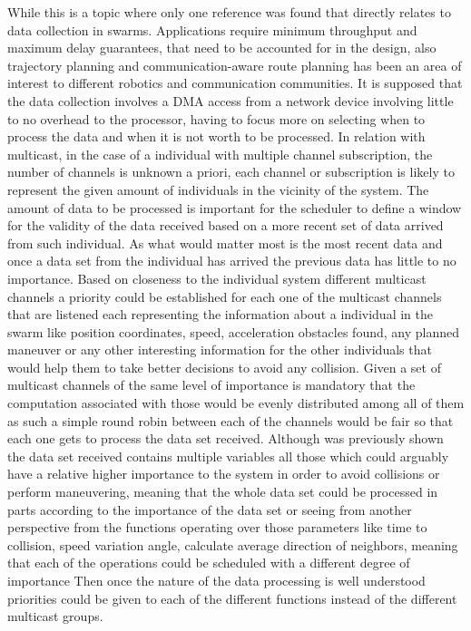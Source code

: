 \documentclass[journal]{IEEEtran}
\begin{document}
While this is a topic where only one reference was found that directly relates to data collection in swarms\cite{HH5}. Applications require minimum throughput and maximum delay guarantees, that need to be accounted for in the design, also trajectory planning  and communication-aware route planning has been an area of interest to different robotics and communication communities\cite{HH5}.
It is supposed that the data collection involves a DMA access from a network device involving little to no overhead to the processor, having to focus more on selecting when to process the data and when it is not worth to be processed.
In relation with multicast, in the case of a individual with multiple channel subscription, the number of channels is unknown a priori, each channel or subscription is likely to represent the given amount of individuals in the vicinity of the system. The amount of data to be processed is important for the scheduler to define a window for the validity of the data received based on a more recent set of data arrived from such individual. As what would matter most is the most recent data and once a data set from the individual has arrived the previous data has little to no importance.
Based on closeness to the individual system different multicast channels a priority could be established for each one of the multicast channels that are listened each representing the information about a individual in the swarm like position coordinates, speed, acceleration obstacles found, any planned maneuver or any other interesting information for the other individuals that would help them to take better decisions to avoid any collision.
Given a set of multicast channels of the same level of importance is mandatory that the computation associated with those would be evenly distributed among all of them as such a simple round robin between each of the channels would be fair so that each one gets to process the data set received.
Although was previously shown the data set received contains multiple variables all those which could arguably have a relative higher importance to the system in order to avoid collisions or perform maneuvering, meaning that the whole data set could be processed in parts according to the importance of the data set or seeing from another perspective from the functions operating over those parameters like time to collision, speed variation angle, calculate average direction of neighbors, meaning that each of the operations could be scheduled with a different degree of importance
Then once the nature of the data processing is well understood priorities could be given to each of the different functions instead of the different multicast groups.
\end{document}
